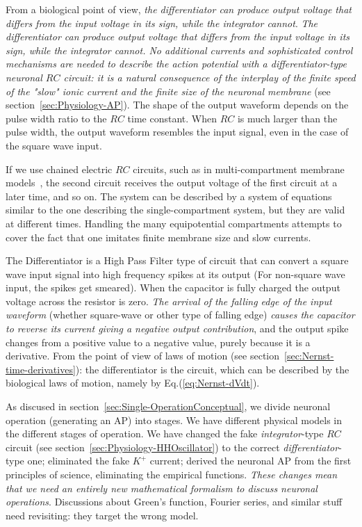  
From a biological point of view, \textit{the differentiator can produce output voltage that
differs from the input voltage in its sign, while the integrator cannot}.
	\textit{The differentiator can produce output voltage that
		differs from the input voltage in its sign, while the integrator cannot.  No additional currents and sophisticated control mechanisms
		are needed to describe the action potential with a differentiator-type neuronal $RC$ circuit: it is a natural consequence of
		the interplay of the finite speed of the "slow" ionic current
		and the finite size of the neuronal membrane} (see section~\ref{sec:Physiology-AP}).
	The shape of the output waveform depends on the pulse width ratio to the $RC$ time constant. When $RC$ is much larger than the pulse width, the output waveform resembles the input signal, even in the case of the square wave input.


If we use chained electric $RC$ circuits, such as in multi-compartment membrane models~\cite{MathNeuroscience:2010,MultiCompartmentNeurons:2023}, the second circuit receives the output voltage of the first circuit at a later time, and so on. The system can be described by a system of equations
similar to the one describing the single-compartment system, but they are
valid at different times. Handling the many equipotential compartments
attempts to cover the fact that one imitates finite membrane size
and slow currents.



The Differentiator is a High Pass Filter type of circuit that can convert a
square wave input signal into high frequency spikes at its output
(For non-square wave input, the spikes get smeared).
When the capacitor is fully charged the output voltage across the resistor is zero.
\textit{The arrival of the falling edge
of the input waveform} (whether square-wave or other type of falling edge)
\textit{causes the capacitor to reverse its current giving a negative output contribution},
and the output spike changes from a positive value to a negative value, purely because it is a derivative. From the point of view of laws of motion (see section~\ref{sec:Nernst-time-derivatives}): the differentiator is the circuit, which can be described by the 
biological laws of motion, namely by Eq.(\ref{eq:Nernst-dVdt}).


As discused in section~\ref{sec:Single-OperationConceptual},
we divide neuronal operation (generating an \gls{AP})
into stages.
We have different physical models in the different
stages of operation. We have changed the fake \textit{integrator}-type $RC$ circuit (see section~\ref{sec:Physiology-HHOscillator}) to the correct \textit{differentiator}-type one; eliminated the fake $K^+$ 
current; derived the neuronal 
\gls{AP}
 from the first principles of science, eliminating 
the empirical functions. \textit{These changes mean that we need an
entirely new mathematical formalism to discuss neuronal operations}. Discussions about Green's function, Fourier series, and similar stuff need revisiting: they target the wrong model.

